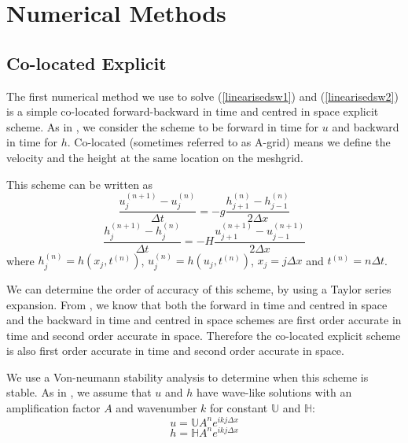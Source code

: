 \documentclass[a4paper, 10.5pt, notitlepage]{article}
\begin{document}
\section{Numerical Methods}\label{numericalmethodssection}

\subsection {Co-located Explicit}
The first numerical method we use to solve (\ref{linearisedsw1}) and (\ref{linearisedsw2}) is a simple co-located forward-backward in time and centred in space explicit scheme. As in \cite{MPE textbook}, we consider the scheme to be forward in time for $u$ and backward in time for $h$. Co-located (sometimes referred to as A-grid) means we define the velocity and the height at the same location on the meshgrid.

This scheme can be written as 
\begin{equation} \label{FTCSAgrid}
\frac{u_{j}^{(n+1)} - u_{j}^{(n)}}{\Delta t} = -g \frac{h_{j+1}^{(n)} - h_{j-1}^{(n)}}{2\Delta x}
\end{equation}
\begin{equation}\label{BTCSAgrid}
\frac{h_{j}^{(n+1)} - h_{j}^{(n)}}{\Delta t} = -H \frac{u_{j+1}^{(n+1)} - u_{j-1}^{(n+1)}}{2\Delta x}
\end{equation}
where $h_{j}^{(n)} = h(x_{j}, t^{(n)})$, $u_{j}^{(n)} = h(u_{j}, t^{(n)})$, $x_{j} = j\Delta x$ and $t^{(n)} = n\Delta t$. 

We can determine the order of accuracy of this scheme, by using a Taylor series expansion. From \cite{MPE textbook}, we know that both the forward in time and centred in space and the backward in time and centred in space schemes are first order accurate in time and second order accurate in space. Therefore the co-located explicit scheme is also first order accurate in time and second order accurate in space.

We use a Von-neumann stability analysis to determine when this scheme is stable. As in \cite{MPE textbook}, we assume that $u$ and $h$ have wave-like solutions with an amplification factor $A$ and wavenumber $k$ for constant $\mathbb{U}$ and $\mathbb{H}$:
\begin{equation} \label{wavelikeu}
u  =  \mathbb{U}  A^{n} e^{ikj\Delta x}
\end{equation}
\begin{equation} \label{wavelikeh}
h  =  \mathbb{H} A^{n} e^{ikj\Delta x}
\end{equation}
\end{document}
